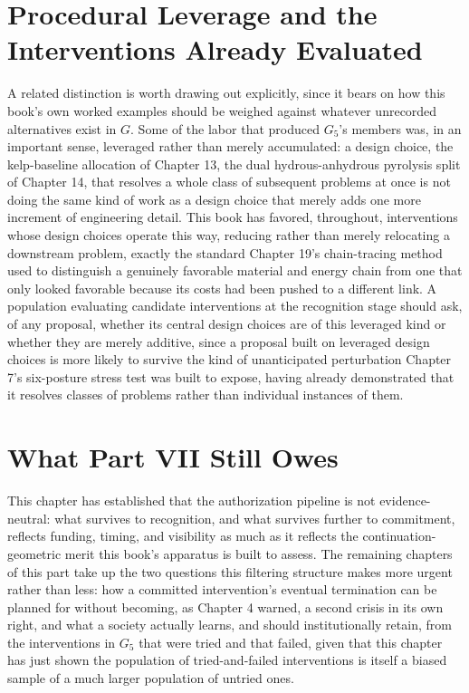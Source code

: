 \documentclass[11pt,oneside]{book}
\begin{document}
\section*{Procedural Leverage and the Interventions Already Evaluated}

A related distinction is worth drawing out explicitly, since it bears on how this book's own worked examples should be weighed against whatever unrecorded alternatives exist in $G$. Some of the labor that produced $G_5$'s members was, in an important sense, leveraged rather than merely accumulated: a design choice, the kelp-baseline allocation of Chapter 13, the dual hydrous-anhydrous pyrolysis split of Chapter 14, that resolves a whole class of subsequent problems at once is not doing the same kind of work as a design choice that merely adds one more increment of engineering detail. This book has favored, throughout, interventions whose design choices operate this way, reducing rather than merely relocating a downstream problem, exactly the standard Chapter 19's chain-tracing method used to distinguish a genuinely favorable material and energy chain from one that only looked favorable because its costs had been pushed to a different link. A population evaluating candidate interventions at the recognition stage should ask, of any proposal, whether its central design choices are of this leveraged kind or whether they are merely additive, since a proposal built on leveraged design choices is more likely to survive the kind of unanticipated perturbation Chapter 7's six-posture stress test was built to expose, having already demonstrated that it resolves classes of problems rather than individual instances of them.

\section*{What Part VII Still Owes}

This chapter has established that the authorization pipeline is not evidence-neutral: what survives to recognition, and what survives further to commitment, reflects funding, timing, and visibility as much as it reflects the continuation-geometric merit this book's apparatus is built to assess. The remaining chapters of this part take up the two questions this filtering structure makes more urgent rather than less: how a committed intervention's eventual termination can be planned for without becoming, as Chapter 4 warned, a second crisis in its own right, and what a society actually learns, and should institutionally retain, from the interventions in $G_5$ that were tried and that failed, given that this chapter has just shown the population of tried-and-failed interventions is itself a biased sample of a much larger population of untried ones.
\end{document}
